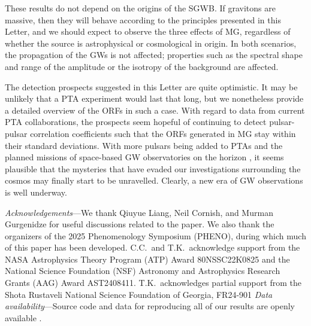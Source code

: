 \documentclass[10pt,prd,twocolumn,aps,nofootinbib,nobibnotes,superscriptaddress,preprintnumbers]{revtex4-2}
\begin{document}
These results do not depend on the origins of the SGWB. If gravitons are massive, then they will behave according to the principles presented in this Letter, and we should expect to observe the three effects of MG, regardless of whether the source is astrophysical or cosmological in origin. In both scenarios, the propagation of the GWs is not affected; properties such as the spectral shape and range of the amplitude \cite{Caprini:2015tfa} or the isotropy of the background \cite{NANOGrav:2023hvm} are affected.

The detection prospects suggested in this Letter are quite optimistic. It may be unlikely that a PTA experiment would last that long, but we nonetheless provide a detailed overview of the ORFs in such a case. With regard to data from current PTA collaborations, the prospects seem hopeful of continuing to detect pulsar-pulsar correlation coefficients such that the ORFs generated in MG stay within their standard deviations. With more pulsars being added to PTAs and the planned missions of space-based GW observatories on the horizon \cite{LISA:2017, TianQin:2015yph, Hu:2017mde}, it seems plausible that the mysteries that have evaded our investigations surrounding the cosmos may finally start to be unravelled. Clearly, a new era of GW observations is well underway. 

\vspace{3mm}
\textit{Acknowledgements}---We thank Qiuyue Liang, Neil Cornish, and Murman Gurgenidze for useful discussions related to the paper. We also thank the organizers of the 2025 Phenomenology Symposium (PHENO), during which much of this paper has been developed. C.C.~and T.K.~acknowledge support from the NASA Astrophysics Theory Program (ATP) Award 80NSSC22K0825 and the National Science Foundation (NSF) Astronomy and Astrophysics Research Grants (AAG) Award AST2408411. T.K.~acknowledges partial support from the Shota Rustaveli National Science Foundation of Georgia, FR24-901
\vspace{3mm}
\textit{Data availability}---Source code and data for reproducing all of our results are openly available \cite{Choi:2025git}.





\clearpage
\end{document}
